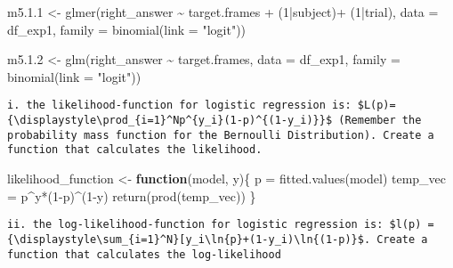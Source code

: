 \documentclass[
]{article}
\newenvironment{Shaded}{\begin{snugshade}}{\end{snugshade}}
\newcommand{\AttributeTok}[1]{\textcolor[rgb]{0.77,0.63,0.00}{#1}}
\newcommand{\ControlFlowTok}[1]{\textcolor[rgb]{0.13,0.29,0.53}{\textbf{#1}}}
\newcommand{\DecValTok}[1]{\textcolor[rgb]{0.00,0.00,0.81}{#1}}
\newcommand{\FloatTok}[1]{\textcolor[rgb]{0.00,0.00,0.81}{#1}}
\newcommand{\FunctionTok}[1]{\textcolor[rgb]{0.00,0.00,0.00}{#1}}
\newcommand{\NormalTok}[1]{#1}
\newcommand{\OtherTok}[1]{\textcolor[rgb]{0.56,0.35,0.01}{#1}}
\newcommand{\SpecialCharTok}[1]{\textcolor[rgb]{0.00,0.00,0.00}{#1}}
\newcommand{\StringTok}[1]{\textcolor[rgb]{0.31,0.60,0.02}{#1}}
\begin{document}
\begin{Shaded}
\begin{Highlighting}[]
\NormalTok{m5.}\FloatTok{1.1} \OtherTok{\textless{}{-}} \FunctionTok{glmer}\NormalTok{(right\_answer }\SpecialCharTok{\textasciitilde{}}\NormalTok{ target.frames }\SpecialCharTok{+}\NormalTok{ (}\DecValTok{1}\SpecialCharTok{|}\NormalTok{subject)}\SpecialCharTok{+}\NormalTok{ (}\DecValTok{1}\SpecialCharTok{|}\NormalTok{trial), }\AttributeTok{data =}\NormalTok{ df\_exp1, }\AttributeTok{family =} \FunctionTok{binomial}\NormalTok{(}\AttributeTok{link =} \StringTok{"logit"}\NormalTok{))}

\NormalTok{m5.}\FloatTok{1.2} \OtherTok{\textless{}{-}} \FunctionTok{glm}\NormalTok{(right\_answer }\SpecialCharTok{\textasciitilde{}}\NormalTok{ target.frames, }\AttributeTok{data =}\NormalTok{ df\_exp1, }\AttributeTok{family =} \FunctionTok{binomial}\NormalTok{(}\AttributeTok{link =} \StringTok{"logit"}\NormalTok{))}
\end{Highlighting}
\end{Shaded}

\begin{verbatim}
i. the likelihood-function for logistic regression is: $L(p)={\displaystyle\prod_{i=1}^Np^{y_i}(1-p)^{(1-y_i)}}$ (Remember the probability mass function for the Bernoulli Distribution). Create a function that calculates the likelihood. 
\end{verbatim}

\begin{Shaded}
\begin{Highlighting}[]
\NormalTok{likelihood\_function }\OtherTok{\textless{}{-}} \ControlFlowTok{function}\NormalTok{(model, y)\{}
\NormalTok{  p }\OtherTok{=} \FunctionTok{fitted.values}\NormalTok{(model)}
\NormalTok{  temp\_vec }\OtherTok{=}\NormalTok{ p}\SpecialCharTok{\^{}}\NormalTok{y}\SpecialCharTok{*}\NormalTok{(}\DecValTok{1}\SpecialCharTok{{-}}\NormalTok{p)}\SpecialCharTok{\^{}}\NormalTok{(}\DecValTok{1}\SpecialCharTok{{-}}\NormalTok{y)}
  \FunctionTok{return}\NormalTok{(}\FunctionTok{prod}\NormalTok{(temp\_vec))}
\NormalTok{\}}
\end{Highlighting}
\end{Shaded}

\begin{verbatim}
ii. the log-likelihood-function for logistic regression is: $l(p) = {\displaystyle\sum_{i=1}^N}[y_i\ln{p}+(1-y_i)\ln{(1-p)}$. Create a function that calculates the log-likelihood  
\end{verbatim}
\end{document}
